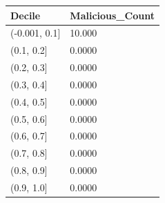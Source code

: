 \begin{tabular}{ll}
\toprule
Decile & Malicious\_Count \\
\midrule
(-0.001, 0.1] & 10.000 \\
(0.1, 0.2] & 0.0000 \\
(0.2, 0.3] & 0.0000 \\
(0.3, 0.4] & 0.0000 \\
(0.4, 0.5] & 0.0000 \\
(0.5, 0.6] & 0.0000 \\
(0.6, 0.7] & 0.0000 \\
(0.7, 0.8] & 0.0000 \\
(0.8, 0.9] & 0.0000 \\
(0.9, 1.0] & 0.0000 \\
\bottomrule
\end{tabular}